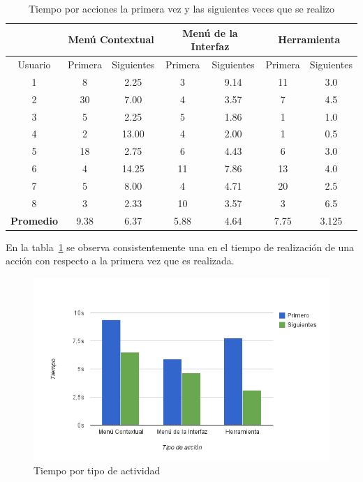 
\begin{table}[!hbt]
\centering
\begin{tabular}{|c|c|c|c|c|c|c|}
\hline
\rowcolor{gris} \textbf{} & \multicolumn{2}{|c|}{\textbf{Menú Contextual}} &
\multicolumn{2}{|c|}{\textbf{Menú de la Interfaz}} &
\multicolumn{2}{|c|}{\textbf{Herramienta}}\\
\hline
\rowcolor{gris} Usuario & Primera & Siguientes & Primera & Siguientes & Primera & Siguientes \\
\hline 1 &  8 &  2.25 &  3 & 9.14 & 11 & 3.0 \\
\hline 2 & 30 &  7.00 &  4 & 3.57 &  7 & 4.5 \\
\hline 3 &  5 &  2.25 &  5 & 1.86 &  1 & 1.0 \\
\hline 4 &  2 & 13.00 &  4 & 2.00 &  1 & 0.5 \\
\hline 5 & 18 &  2.75 &  6 & 4.43 &  6 & 3.0 \\
\hline 6 &  4 & 14.25 & 11 & 7.86 & 13 & 4.0 \\
\hline 7 &  5 &  8.00 &  4 & 4.71 & 20 & 2.5 \\
\hline 8 &  3 &  2.33 & 10 & 3.57 &  3 & 6.5 \\
\hline
\textbf{Promedio} & 9.38 & 6.37 & 5.88 & 4.64 & 7.75 & 3.125 \\
\end{tabular}
\caption{Tiempo por acciones la primera vez y las siguientes veces que se realizo}
\label{tab:interfaz_tiempo_acciones}
\end{table}

En la tabla~\ref{tab:interfaz_tiempo_acciones} se observa consistentemente una
 en el tiempo de realización de una acción con
respecto a la primera vez que es realizada. 

\begin{figure}[hbt!]
\centering
\includegraphics[width=14cm]{resultados/imagenes/interfaz_tiempo_actividades.png}
\caption{Tiempo por tipo de actividad}
\label{fig:interfaz_tiempo_acciones}
\end{figure}

